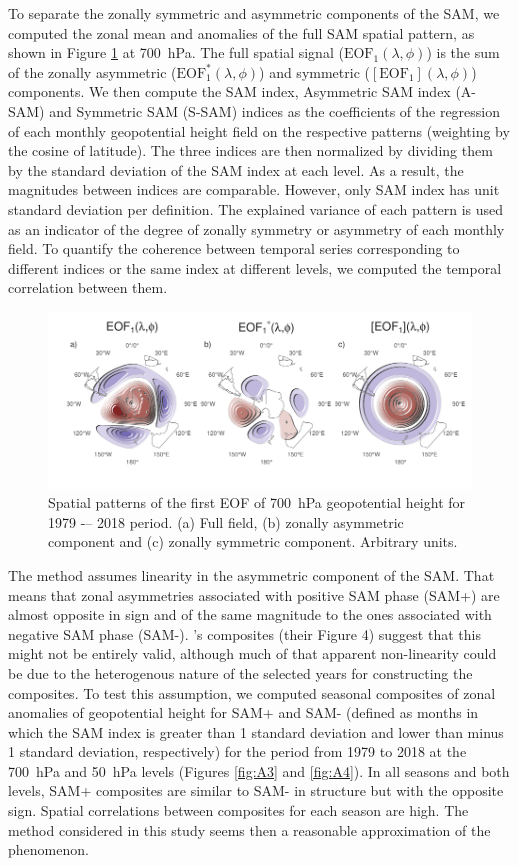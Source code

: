 \documentclass[smallextended]{svjour3}       %
\begin{document}
To separate the zonally symmetric and asymmetric components of the SAM, we computed the zonal mean and anomalies of the full SAM spatial pattern, as shown in Figure \ref{fig:method} at 700~hPa. The full spatial signal (\(\mathrm{EOF_1}(\lambda, \phi)\)) is the sum of the zonally asymmetric (\(\mathrm{EOF_1^*}(\lambda, \phi)\)) and symmetric (\([\mathrm{EOF_1}](\lambda, \phi)\)) components. We then compute the SAM index, Asymmetric SAM index (A\nobreakdash-SAM) and Symmetric SAM (S\nobreakdash-SAM) indices as the coefficients of the regression of each monthly geopotential height field on the respective patterns (weighting by the cosine of latitude). The three indices are then normalized by dividing them by the standard deviation of the SAM index at each level. As a result, the magnitudes between indices are comparable. However, only SAM index has unit standard deviation per definition. The explained variance of each pattern is used as an indicator of the degree of zonally symmetry or asymmetry of each monthly field. To quantify the coherence between temporal series corresponding to different indices or the same index at different levels, we computed the temporal correlation between them.

\begin{figure}
\includegraphics{method-1} \caption{Spatial patterns of the first EOF of 700~hPa geopotential height for 1979 -– 2018 period. (a) Full field, (b) zonally asymmetric component and (c) zonally symmetric component. Arbitrary units.}\label{fig:method}
\end{figure}

The method assumes linearity in the asymmetric component of the SAM. That means that zonal asymmetries associated with positive SAM phase (SAM+) are almost opposite in sign and of the same magnitude to the ones associated with negative SAM phase (SAM-). \citet{fogt2012}'s composites (their Figure 4) suggest that this might not be entirely valid, although much of that apparent non-linearity could be due to the heterogenous nature of the selected years for constructing the composites. To test this assumption, we computed seasonal composites of zonal anomalies of geopotential height for SAM+ and SAM- (defined as months in which the SAM index is greater than 1 standard deviation and lower than minus 1 standard deviation, respectively) for the period from 1979 to 2018 at the 700~hPa and 50~hPa levels (Figures \ref{fig:A3} and \ref{fig:A4}). In all seasons and both levels, SAM+ composites are similar to SAM- in structure but with the opposite sign. Spatial correlations between composites for each season are high. The method considered in this study seems then a reasonable approximation of the phenomenon.
\end{document}
